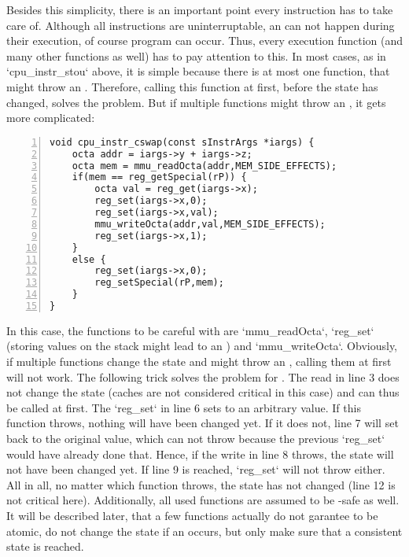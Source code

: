 Besides this simplicity, there is an important point every instruction has to take care of. Although all instructions are uninterruptable, \ie an  can not happen during their execution, of course program  can occur. Thus, every execution function (and many other functions as well) has to pay attention to this. In most cases, as in `cpu_instr_stou` above, it is simple because there is at most one function, that might throw an . Therefore, calling this function at first, \ie before the state has changed, solves the problem. But if multiple functions might throw an , it gets more complicated:
\begin{lstlisting}[language=GIMMIXC,numbers=left,numberstyle=\footnotesize,caption=Execution function of \mi{CSWAP}]
void cpu_instr_cswap(const sInstrArgs *iargs) {
	octa addr = iargs->y + iargs->z;
	octa mem = mmu_readOcta(addr,MEM_SIDE_EFFECTS);
	if(mem == reg_getSpecial(rP)) {
		octa val = reg_get(iargs->x);
		reg_set(iargs->x,0);
		reg_set(iargs->x,val);
		mmu_writeOcta(addr,val,MEM_SIDE_EFFECTS);
		reg_set(iargs->x,1);
	}
	else {
		reg_set(iargs->x,0);
		reg_setSpecial(rP,mem);
	}
}
\end{lstlisting}
In this case, the functions to be careful with are `mmu_readOcta`, `reg_set` (storing values on the stack might lead to an ) and `mmu_writeOcta`. Obviously, if multiple functions change the state and might throw an , calling them at first will not work. The following trick solves the problem for . The read in line 3 does not change the state (caches are not considered critical in this case) and can thus be called at first. The `reg_set` in line 6 sets  to an arbitrary value. If this function throws, nothing will have been changed yet. If it does not, line 7 will set  back to the original value, which can not throw because the previous `reg_set` would have already done that. Hence, if the write in line 8 throws, the state will not have been changed yet. If line 9 is reached, `reg_set` will not throw either. All in all, no matter which function throws, the state has not changed (line 12 is not critical here). Additionally, all used functions are assumed to be -safe as well. It will be described later, that a few functions actually do not garantee to be atomic, \ie do not change the state if an  occurs, but only make sure that a consistent state is reached.

